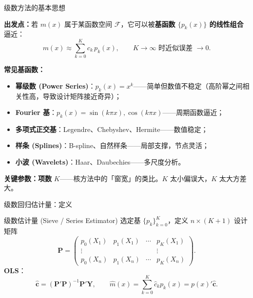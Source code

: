 \documentclass[aspectratio=169, 10pt]{beamer}
\begin{document}
\begin{frame}{级数方法的基本思想}

  \begin{keybox}
    \textbf{出发点：}若 $m(x)$ 属于某函数空间 $\mathcal{F}$，它可以被\textbf{基函数 $\{p_k(x)\}$ 的线性组合}逼近：
    \[
      m(x) \approx \sum_{k=0}^{K} c_k\, p_k(x),\qquad K\to\infty\text{ 时近似误差 }\to 0.
    \]
  \end{keybox}

  \vspace{0.3em}

  \textbf{常见基函数：}
  \begin{itemize}
    \item \textbf{幂级数 (Power Series)}：$p_k(x) = x^k$——简单但数值不稳定（高阶幂之间相关性高，导致设计矩阵接近奇异）；
    \item \textbf{Fourier 基}：$p_k(x) = \sin(k\pi x), \cos(k\pi x)$——周期函数逼近；
    \item \textbf{多项式正交基}：Legendre、Chebyshev、Hermite——数值稳定；
    \item \textbf{样条 (Splines)}：B-spline、自然样条——局部支撑，节点灵活；
    \item \textbf{小波 (Wavelets)}：Haar、Daubechies——多尺度分析。
  \end{itemize}

  \textbf{关键参数：}\textbf{项数} $K$——核方法中的「窗宽」的类比。$K$ 太小偏误大，$K$ 太大方差大。

\end{frame}


\begin{frame}{级数回归估计量：定义}

  \begin{definitionbox}{级数估计量 (Sieve / Series Estimator)}
    选定基 $\{p_k\}_{k=0}^K$，定义 $n\times(K+1)$ 设计矩阵
    \[
      \mathbf{P} = \begin{pmatrix}
        p_0(X_1) & p_1(X_1) & \cdots & p_K(X_1) \\
        \vdots & & & \vdots \\
        p_0(X_n) & p_1(X_n) & \cdots & p_K(X_n)
      \end{pmatrix}.
    \]
    \textbf{OLS}：
    \[
      \hat{\boldsymbol{c}} = (\mathbf{P}'\mathbf{P})^{-1} \mathbf{P}' \mathbf{Y},\qquad
      \hat m(x) = \sum_{k=0}^K \hat c_k p_k(x) = p(x)'\hat{\boldsymbol{c}}.
    \]
  \end{definitionbox}

\end{frame}
\end{document}
